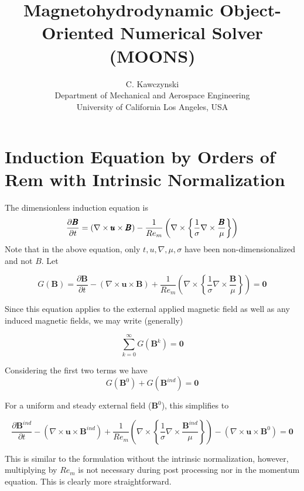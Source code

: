 \documentclass[11pt]{article}
\begin{document}
\doublespacing
\title{Magnetohydrodynamic Object-Oriented Numerical Solver (MOONS)}
\author{C. Kawczynski \\
Department of Mechanical and Aerospace Engineering \\
University of California Los Angeles, USA\\
}
\maketitle

\section{Induction Equation by Orders of Rem with Intrinsic Normalization}
The dimensionless induction equation is
\begin{equation}
  \label{eq:ind}
  \frac{\partial \pmb{B}}{\partial t} 
  =
  (\nabla \times \pmb{u} \times \pmb{B})
  - \\
  \frac{1}{Re_m}
  \left(
  \nabla \times
  \left\{
  \frac{1}{\sigma}
  \nabla \times
  \frac{\pmb{B}}{\mu}
  \right\}
  \right)
\end{equation}
Note that in the above equation, only $t,u,\nabla , \mu, \sigma$ have been non-dimensionalized and not $B$. Let

\begin{equation}
  G(\pmb{B})
  =
  \frac{\partial \pmb{B}}{\partial t} 
  -
  (\nabla \times \pmb{u} \times \pmb{B})
  +
  \frac{1}{Re_m}
  \left(
  \nabla \times
  \left\{
  \frac{1}{\sigma}
  \nabla \times
  \frac{\pmb{B}}{\mu}
  \right\}
  \right)
  =
  \pmb{0}
\end{equation}

Since this equation applies to the external applied magnetic field as well as any induced magnetic fields, we may write (generally)

\begin{equation}
	\sum_{k=0}^{\infty} G(\pmb{B}^k)
	=
	\pmb{0}
\end{equation}

Considering the first two terms we have
\begin{equation}
  G(\pmb{B}^0)
  +
  G(\pmb{B}^{ind})
  =
  \pmb{0}
\end{equation}

For a uniform and steady external field ($\pmb{B}^0$), this simplifies to


\begin{equation}
  \frac{\partial \pmb{B}^{ind}}{\partial t} 
  -
  (\nabla \times \pmb{u} \times \pmb{B}^{ind})
  +
  \frac{1}{Re_m}
  \left(
  \nabla \times
  \left\{
  \frac{1}{\sigma}
  \nabla \times
  \frac{\pmb{B}^{ind}}{\mu}
  \right\}
  \right)
  -
  (\nabla \times \pmb{u} \times \pmb{B}^0)
  =
  \pmb{0}
\end{equation}

This is similar to the formulation without the intrinsic normalization, however, multiplying by $Re_m$ is not necessary during post processing nor in the momentum equation. This is clearly more straightforward.
\end{document}
